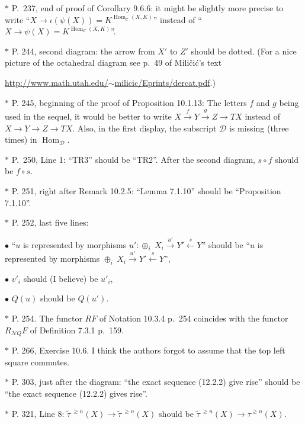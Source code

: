 \documentclass[12pt]{article}
\theoremstyle{remark}
\theoremstyle{definition}
\newcommand{\bu}{\bullet}
\newcommand{\cc}{\mathcal}
\newcommand{\C}{\mathcal C}
\newcommand{\xr}{\xrightarrow}
\DeclareMathOperator{\Hom}{Hom}%
\begin{document}
\noindent $*$ P.~237, end of proof of Corollary 9.6.6: it might be slightly more precise to write ``$X\to\iota(\psi(X))=K^{\Hom_\C(X,K)}$'' instead of ``$X\to\psi(X)=K^{\Hom_\C(X,K)}$''.

\noindent $*$ P. 244, second diagram: the arrow from $X'$ to $Z'$ should be dotted. (For a nice picture of the octahedral diagram see p.~49 of Mili\v{c}i\'c's text

\href{http://www.math.utah.edu/~milicic/Eprints/dercat.pdf}{http://www.math.utah.edu/$\sim$milicic/Eprints/dercat.pdf}.)

\noindent $*$ P. 245, beginning of the proof of Proposition 10.1.13: The letters $f$ and $g$ being used in the sequel, it would be better to write $X\xr fY\xr gZ\to TX$ instead of $X\to Y\to Z\to TX$. Also, in the first display, the subscript $\cc D$ is missing (three times) in $\Hom_{\cc D}$.

\noindent $*$ P.~250, Line 1: ``TR3'' should be ``TR2''. After the second diagram, $s\circ f$ should be $f\circ s$.

\noindent $*$ P. 251, right after Remark 10.2.5: ``Lemma 7.1.10'' should be ``Proposition 7.1.10''.

\noindent $*$ P. 252, last five lines:

$\bu$ ``$u$ is represented by morphisms $u':\oplus_i\ X_i\xr{u'}Y'\xleftarrow sY$'' should be ``$u$ is represented by morphisms $\oplus_i\ X_i\xr{u'}Y'\xleftarrow sY$'',

$\bu$ $v'_i$ should (I believe) be $u'_i$,


$\bu$ $Q(u)$ should be $Q(u')$.

\noindent $*$ P. 254. The functor $RF$ of Notation 10.3.4 p.~254 coincides with the functor $R_{\cc NQ}F$ of Definition 7.3.1 p.~159.

\noindent $*$ P. 266, Exercise 10.6. I think the authors forgot to assume that the top left square commutes.


\noindent $*$ P. 303, just after the diagram: ``the exact sequence (12.2.2) give rise'' should be ``the exact sequence (12.2.2) gives rise''.

\noindent $*$ P. 321, Line 8: $\widetilde\tau\,{}^{\ge n}(X)\to\widetilde\tau\,{}^{\ge n}(X)$ should be $\widetilde\tau\,{}^{\ge n}(X)\to\tau^{\ge n}(X)$.
\end{document}
